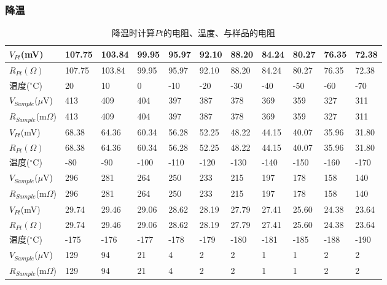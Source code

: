 \documentclass[UTF8]{ctexart}
\begin{document}
    \subsubsection{降温}

    \begin{table}[H]
        \centering
        \begin{tabular}{|l|l|l|l|l|l|l|l|l|l|l|}
        \hline
            $V_{Pt}$(mV) & 107.75 & 103.84 & 99.95 & 95.97 & 92.10 & 88.20 & 84.24 & 80.27 & 76.35 & 72.38 \\ \hline
            $R_{Pt}(\Omega)$ & 107.75 & 103.84 & 99.95 & 95.97 & 92.10 & 88.20 & 84.24 & 80.27 & 76.35 & 72.38 \\ \hline
            温度($^{\circ}$C) & 20 & 10 & 0 & -10 & -20 & -30 & -40 & -50 & -60 & -70 \\ \hline
            $V_{Sample}$($\mu$V) & 413 & 409 & 404 & 397 & 387 & 378 & 369 & 359 & 327 & 311 \\ \hline
            $R_{Sample}$(m$\Omega$) & 413 & 409 & 404 & 397 & 387 & 378 & 369 & 359 & 327 & 311 \\ \hline
            \hline
            $V_{Pt}$(mV) & 68.38 & 64.36 & 60.34 & 56.28 & 52.25 & 48.22 & 44.15 & 40.07 & 35.96 & 31.80 \\ \hline
            $R_{Pt}(\Omega)$ & 68.38 & 64.36 & 60.34 & 56.28 & 52.25 & 48.22 & 44.15 & 40.07 & 35.96 & 31.80 \\ \hline
            温度($^{\circ}$C) & -80 & -90 & -100 & -110 & -120 & -130 & -140 & -150 & -160 & -170 \\ \hline
            $V_{Sample}$($\mu$V) & 296 & 281 & 264 & 250 & 233 & 215 & 197 & 178 & 158 & 140 \\ \hline
            $R_{Sample}$(m$\Omega$) & 296 & 281 & 264 & 250 & 233 & 215 & 197 & 178 & 158 & 140 \\ \hline
            \hline
            $V_{Pt}$(mV) & 29.74 & 29.46 & 29.06 & 28.62 & 28.19 & 27.79 & 27.41 & 25.60 & 24.38 & 23.64 \\ \hline
            $R_{Pt}(\Omega)$ & 29.74 & 29.46 & 29.06 & 28.62 & 28.19 & 27.79 & 27.41 & 25.60 & 24.38 & 23.64 \\ \hline
            温度($^{\circ}$C) & -175 & -176 & -177 & -178 & -179 & -180 & -181 & -185 & -188 & -190 \\ \hline
            $V_{Sample}$($\mu$V) & 129 & 94 & 21 & 4 & 2 & 2 & 1 & 1 & 2 & 2 \\ \hline
            $R_{Sample}$(m$\Omega$) & 129 & 94 & 21 & 4 & 2 & 2 & 1 & 1 & 2 & 2 \\ \hline
        \end{tabular}
        \caption{降温时计算$Pt$的电阻、温度、与样品的电阻} %
        \label{降温计算表格} %
    \end{table}
\end{document}
